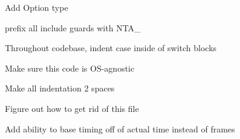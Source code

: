 
\begin{DoxyRefList}
\item[\label{todo__todo000003}%
\Hypertarget{todo__todo000003}%
Namespace \hyperlink{namespacenta}{nta} ]Add Option type 

prefix all include guards with N\+T\+A\+\_\+ 

Throughout codebase, indent {\ttfamily case} inside of {\ttfamily switch} blocks 

Make sure this code is O\+S-\/agnostic 

Make all indentation 2 spaces 

Figure out how to get rid of this file  
\item[\label{todo__todo000001}%
\Hypertarget{todo__todo000001}%
Class \hyperlink{classnta_1_1CallbackManager}{nta\+:\+:Callback\+Manager} ]Add ability to base timing off of actual time instead of frames 


\end{DoxyRefList}
